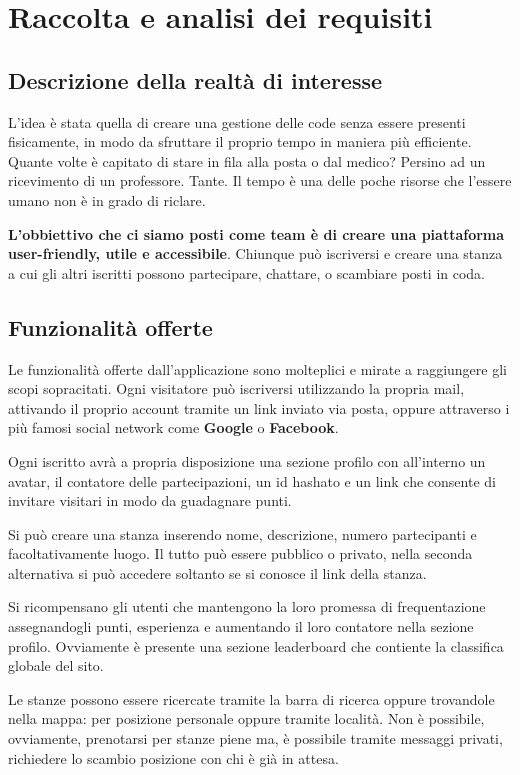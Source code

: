 \chapter{Raccolta e analisi dei requisiti}
	\section{Descrizione della realtà di interesse}
	L'idea è stata quella di creare una gestione delle code senza essere presenti fisicamente, in modo da sfruttare il proprio tempo in maniera più efficiente.
	Quante volte è capitato di stare in fila alla posta o dal medico? Persino ad un ricevimento di un professore. Tante. Il tempo è una delle poche risorse che l'essere umano non è in grado di riclare.
	
	\textbf{L'obbiettivo che ci siamo posti come team è di creare una piattaforma user-friendly, utile e accessibile}.
	Chiunque può iscriversi e creare una stanza a cui gli altri iscritti possono partecipare, chattare, o scambiare posti in coda. 
	\section{Funzionalità offerte}
	Le funzionalità offerte dall'applicazione sono molteplici e mirate a raggiungere gli scopi sopracitati. Ogni visitatore può iscriversi utilizzando la propria mail, attivando il proprio account tramite un link inviato via posta, oppure attraverso i più famosi social network come \textbf{Google} o \textbf{Facebook}.
	
	Ogni iscritto avrà a propria disposizione una sezione profilo con all'interno un avatar, il contatore delle partecipazioni, un id hashato e un link che consente di invitare visitari in modo da guadagnare punti.
	
	Si può creare una stanza inserendo nome, descrizione, numero partecipanti e facoltativamente luogo. Il tutto può essere pubblico o privato, nella seconda alternativa si può accedere soltanto se si conosce il link della stanza.
	
	Si ricompensano gli utenti che mantengono la loro promessa di frequentazione assegnandogli punti, esperienza e aumentando il loro contatore nella sezione profilo. Ovviamente è presente una sezione leaderboard che contiente la classifica globale del sito.
	
	Le stanze possono essere ricercate tramite la barra di ricerca oppure trovandole nella mappa: per posizione personale oppure tramite località. Non è possibile, ovviamente, prenotarsi per stanze piene ma, è possibile tramite messaggi privati, richiedere lo scambio posizione con chi è già in attesa.
	
